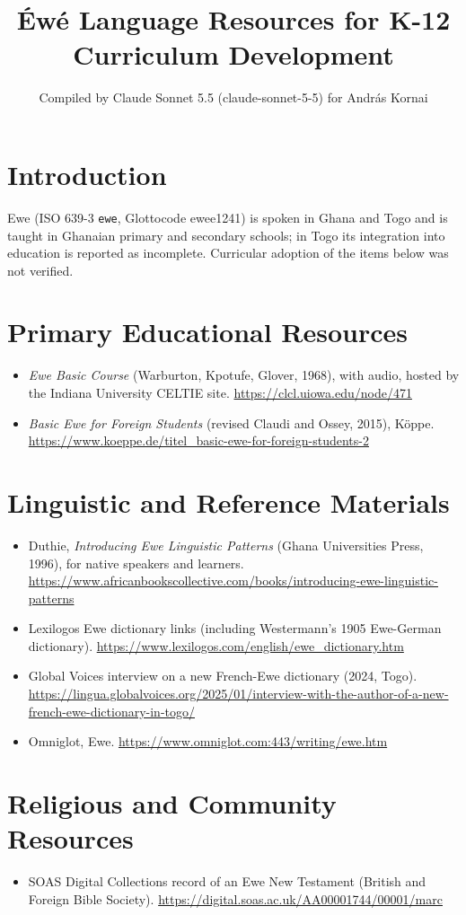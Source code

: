 \documentclass[12pt]{article}
\title{\'Ew\'e Language Resources for K-12 Curriculum Development}
\author{Compiled by Claude Sonnet 5.5 (claude-sonnet-5-5) for Andr\'as Kornai}
\date{}
\begin{document}
\maketitle
\section{Introduction}
Ewe (ISO 639-3 \texttt{ewe}, Glottocode ewee1241) is spoken in Ghana and Togo and is taught in Ghanaian primary and secondary schools; in Togo its integration into education is reported as incomplete. Curricular adoption of the items below was not verified.
\section{Primary Educational Resources}
\begin{itemize}
\item \emph{Ewe Basic Course} (Warburton, Kpotufe, Glover, 1968), with audio, hosted by the Indiana University CELTIE site. \url{https://clcl.uiowa.edu/node/471}
\item \emph{Basic Ewe for Foreign Students} (revised Claudi and Ossey, 2015), K\"oppe. \url{https://www.koeppe.de/titel_basic-ewe-for-foreign-students-2}
\end{itemize}
\section{Linguistic and Reference Materials}
\begin{itemize}
\item Duthie, \emph{Introducing Ewe Linguistic Patterns} (Ghana Universities Press, 1996), for native speakers and learners. \url{https://www.africanbookscollective.com/books/introducing-ewe-linguistic-patterns}
\item Lexilogos Ewe dictionary links (including Westermann's 1905 Ewe-German dictionary). \url{https://www.lexilogos.com/english/ewe_dictionary.htm}
\item Global Voices interview on a new French-Ewe dictionary (2024, Togo). \url{https://lingua.globalvoices.org/2025/01/interview-with-the-author-of-a-new-french-ewe-dictionary-in-togo/}
\item Omniglot, Ewe. \url{https://www.omniglot.com:443/writing/ewe.htm}
\end{itemize}
\section{Religious and Community Resources}
\begin{itemize}
\item SOAS Digital Collections record of an Ewe New Testament (British and Foreign Bible Society). \url{https://digital.soas.ac.uk/AA00001744/00001/marc}
\end{itemize}
\end{document}
